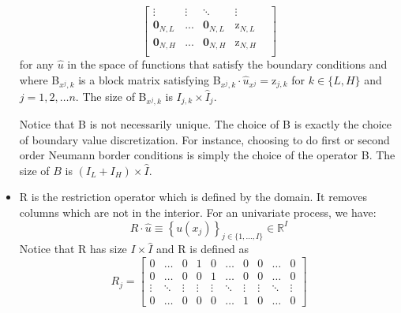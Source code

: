 \documentclass[11pt]{article}
\newcommand{\set}[1]{\ensuremath{\left\{{#1}\right\}}}
\newcommand{\R}{\ensuremath{\mathbb{R}}}
\begin{document}
\begin{itemize}
\begin{equation}
\begin{bmatrix}
		\vdots  & \vdots  & \ddots & \vdots \\
		\mathbf{0}_{N,L}       & ...    & \mathbf{0}_{N,L} & \text{z}_{{N},L} & \\
		\mathbf{0}_{N,H}       & ...    & \mathbf{0}_{N,H} & \text{z}_{{N},H} & \\
		\end{bmatrix}
		\label{B_operator_block}
		\end{equation}
		for any $\hat{u}$ in the space of functions that satisfy the boundary conditions and where B$_{x^j,k}$ is a block matrix satisfying B$_{x^j,k}\cdot \hat{u}_{x^j} = \text{z}_{j,k}$ for $k \in \{L,H\}$ and $j = 1, 2,\dots n$. The size of B$_{x^j,k}$ is $I_{j,k} \times \hat{I}_j$.
		
		Notice that B is not necessarily unique. The choice of B is exactly the choice of boundary value discretization. For instance, choosing to do first or second order Neumann border conditions is simply the choice of the operator B. The size of $B$ is $(I_L + I_H) \times \hat{I}$.
		
		\item R is the restriction operator which is defined by the domain. It removes columns which are not in the interior. 
		For an univariate process, we have:
		\begin{equation}
		R\cdot \hat{u}  \equiv\set{u(x_j)}_{j \in \{1,...,I\}} \in \R^{I} \label{R_operator}
		\end{equation}
		Notice that R has size $I \times \hat{I}$ and R is defined as
				\begin{equation}
		R_j = %
		\begin{bmatrix}
		0&\dots&0&1&0&\dots&0&0&\dots&0\\
		0&\dots&0&0&1&\dots&0&0&\dots&0\\
		\vdots&\ddots&\vdots&\vdots&\vdots&\ddots&\vdots&\vdots&\ddots&\vdots\\
		0&\dots&0&0&0&\dots&1&0&\dots&0
		\end{bmatrix}%
		\end{equation}
		\hspace{5.1cm} \begin{tikzpicture}[every text node part/.style={align=center}]
		

\end{tikzpicture}
\end{itemize}
\end{document}
